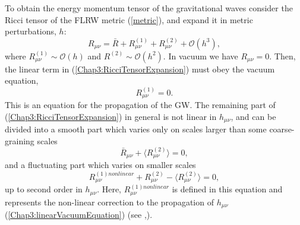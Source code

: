 \documentclass[11pt,a4paper,twoside]{book}
\begin{document}
To obtain the energy momentum tensor of the gravitational waves consider the Ricci tensor of the FLRW metric (\ref{metric}), and expand it in metric perturbations, $ h $:
\begin{equation}
	\label{Chap3:RicciTensorExpansion}
	R_{\mu\nu} = \bar{R} + R^{(1)}_{\mu\nu} + R^{(2)}_{\mu\nu} + \mathcal{O}(h^{3}),
\end{equation}
where  $ R^{(1)}_{\mu\nu} \sim \mathcal{O}(h) $ and $ R^{(2)} \sim \mathcal{O}(h^{2}) $. In  vacuum we have $ R_{\mu\nu} = 0 $. Then, the linear term in (\ref{Chap3:RicciTensorExpansion}) must obey the vacuum equation,
\begin{equation} 
\label{Chap3:linearVacuumEquation}
	R^{(1)}_{\mu\nu} = 0.
\end{equation}
This is an equation for the propagation of the GW. The remaining part of (\ref{Chap3:RicciTensorExpansion}) in general is not linear in $ h_{\mu\nu} $, and can be divided into a smooth part which varies only on scales larger than some coarse-graining scales
\begin{equation}
	\label{Chap3:EqRicciTensor}
	\bar{R}_{\mu\nu} + \langle R_{\mu\nu}^{(2)} \rangle = 0, 
\end{equation}
and a fluctuating part which varies on smaller scales
\begin{equation}
	\label{Chap3:RicciEquationFluctuating part}
	R_{\mu\nu}^{(1)nonlinear} + R^{(2)}_{\mu\nu} - \langle R^{(2)}_{\mu\nu}\rangle = 0,
\end{equation}
up to second order in $ h_{\mu\nu} $. Here, $ R_{\mu\nu}^{(1)nonlinear}  $ is defined in this equation and represents the non-linear correction to the propagation of $ h_{\mu\nu} $ (\ref{Chap3:linearVacuumEquation}) (see \cite{Chap3:GW_Watanabe_Komatsu},\cite{Chap3: Gravitation}).
\end{document}
